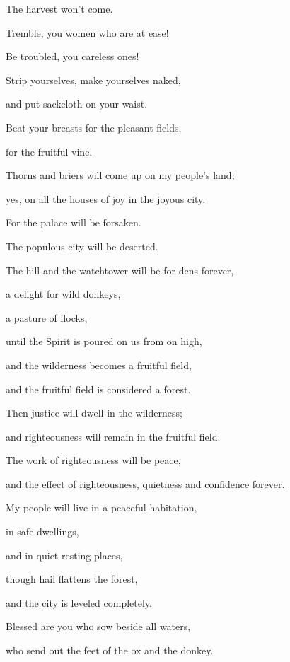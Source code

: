 {\par }{\QB The harvest won’t come.
\par }{\Q {}Tremble, you women who are at ease!
\par }{\QB Be troubled, you careless ones!
\par }{\QB Strip yourselves, make yourselves naked,
\par }{\QB and put sackcloth on your waist.
\par }{\Q {}Beat your breasts for the pleasant fields,
\par }{\QB for the fruitful vine.
\par }{\Q {}Thorns and briers will come up on my people’s land;
\par }{\QB yes, on all the houses of joy in the joyous city.
\par }{\Q {}For the palace will be forsaken.
\par }{\QB The populous city will be deserted.
\par }{\QB The hill and the watchtower will be for dens forever,
\par }{\QB a delight for wild donkeys,
\par }{\QB a pasture of flocks,
\par }{\Q {}until the Spirit is poured on us from on high,
\par }{\QB and the wilderness becomes a fruitful field,
\par }{\QB and the fruitful field is considered a forest.
\par }{\BB \par }{\Q {}Then justice will dwell in the wilderness;
\par }{\QB and righteousness will remain in the fruitful field.
\par }{\Q {}The work of righteousness will be peace,
\par }{\QB and the effect of righteousness, quietness and confidence forever.
\par }{\Q {}My people will live in a peaceful habitation,
\par }{\QB in safe dwellings,
\par }{\QB and in quiet resting places,
\par }{\Q {}though hail flattens the forest,
\par }{\QB and the city is leveled completely.
\par }{\Q {}Blessed are you who sow beside all waters,
\par }{\QB who send out the feet of the ox and the donkey.

}
